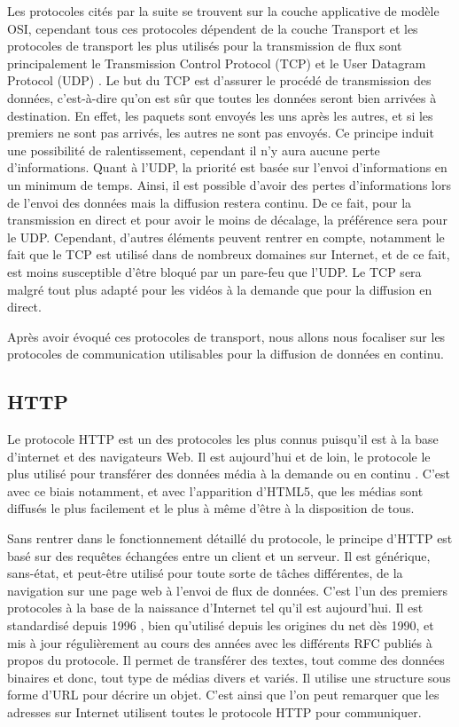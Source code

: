 \documentclass{polytech/polytech}
\begin{document}
Les protocoles cités par la suite se trouvent sur la couche applicative de modèle OSI, cependant tous ces protocoles dépendent de la couche Transport et les protocoles de transport les plus utilisés pour la transmission de flux sont principalement le Transmission Control Protocol (TCP) et le User Datagram Protocol (UDP) \cite{_how_2016}. Le but du TCP est d’assurer le procédé de transmission des données, c’est-à-dire qu’on est sûr que toutes les données seront bien arrivées à destination. En effet, les paquets sont envoyés les uns après les autres, et si les premiers ne sont pas arrivés, les autres ne sont pas envoyés. Ce principe induit une possibilité de ralentissement, cependant il n’y aura aucune perte d’informations. Quant à l’UDP, la priorité est basée sur l’envoi d’informations en un minimum de temps. Ainsi, il est possible d’avoir des pertes d’informations lors de l’envoi des données mais la diffusion restera continu. De ce fait, pour la transmission en direct et pour avoir le moins de décalage, la préférence sera pour le UDP. Cependant, d’autres éléments peuvent rentrer en compte, notamment le fait que le TCP est utilisé dans de nombreux domaines sur Internet, et de ce fait, est moins susceptible d’être bloqué par un pare-feu que l’UDP. Le TCP sera malgré tout plus adapté pour les vidéos à la demande que pour la diffusion en direct.

Après avoir évoqué ces protocoles de transport, nous allons nous focaliser sur les protocoles de communication utilisables pour la diffusion de données en continu.


\subsection{HTTP}
\label{subsec:http}

Le protocole HTTP est un des protocoles les plus connus puisqu’il est à la base d’internet et des navigateurs Web. Il est aujourd’hui et de loin, le protocole le plus utilisé pour transférer des données média à la demande ou en continu \cite{_live_2017}. C’est avec ce biais notamment, et avec l’apparition d’HTML5, que les médias sont diffusés le plus facilement et le plus à même d’être à la disposition de tous.

Sans rentrer dans le fonctionnement détaillé du protocole, le principe d’HTTP est basé sur des requêtes échangées entre un client et un serveur. Il est générique, sans-état, et peut-être utilisé pour toute sorte de tâches différentes, de la navigation sur une page web à l’envoi de flux de données. C’est l’un des premiers protocoles à la base de la naissance d’Internet tel qu’il est aujourd’hui. Il est standardisé depuis 1996 \cite{fielding_hypertext_1996}, bien qu’utilisé depuis les origines du net dès 1990, et mis à jour régulièrement au cours des années avec les différents RFC publiés à propos du protocole. Il permet de transférer des textes, tout comme des données binaires et donc, tout type de médias divers et variés. Il utilise une structure sous forme d’URL pour décrire un objet. C’est ainsi que l’on peut remarquer que les adresses sur Internet utilisent toutes le protocole HTTP pour communiquer.
\end{document}

